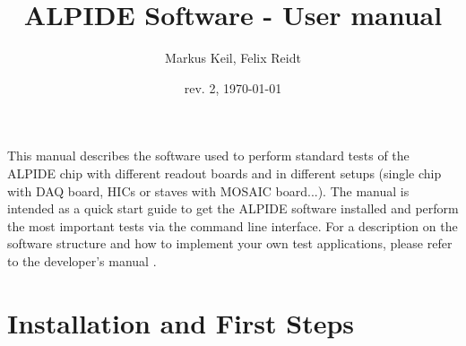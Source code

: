 \documentclass{article}
\begin{document}
\title{ALPIDE Software - User manual}
\date{rev. 2, \today}
\author{Markus Keil, Felix Reidt}
\maketitle

This manual describes the software used to perform standard tests of the ALPIDE chip with different readout boards and in different setups (single chip with DAQ board, HICs or staves with MOSAIC board...).
The manual is intended as a quick start guide to get the ALPIDE
software installed and perform the most important tests via the
command line interface. For a description on the software structure and how to implement your own test applications, please refer to the developer's manual .


\section {Installation and First Steps}
\end{document}
